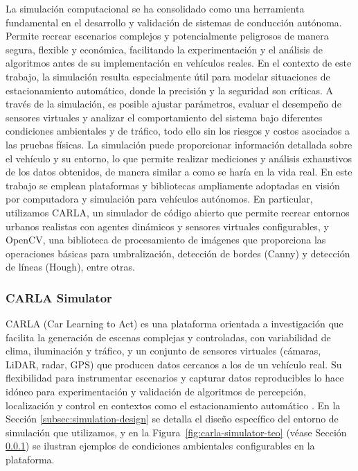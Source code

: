 \noindent
La simulación computacional se ha consolidado como una herramienta fundamental
en el desarrollo y validación de sistemas de conducción autónoma.
Permite recrear escenarios complejos y potencialmente peligrosos de manera segura,
flexible y económica, facilitando la experimentación y el análisis de algoritmos
antes de su implementación en vehículos reales. En el contexto de este trabajo,
la simulación resulta especialmente útil para modelar situaciones de estacionamiento
automático, donde la precisión y la seguridad son críticas. A través de la simulación,
es posible ajustar parámetros, evaluar el desempeño de sensores virtuales y analizar el
comportamiento del sistema bajo diferentes condiciones ambientales y de tráfico,
todo ello sin los riesgos y costos asociados a las pruebas físicas.
La simulación puede proporcionar información detallada sobre el vehículo y
su entorno, lo que permite realizar mediciones y análisis exhaustivos de los
datos obtenidos, de manera similar a como se haría en la vida real.
\noindent
En este trabajo se emplean plataformas y bibliotecas ampliamente adoptadas en visión
por computadora y simulación para vehículos autónomos.
En particular, utilizamos CARLA, un simulador de código abierto que permite recrear entornos urbanos realistas
con agentes dinámicos y sensores virtuales configurables, y OpenCV, una biblioteca de procesamiento
de imágenes que proporciona las operaciones básicas para umbralización, detección de bordes (Canny)
y detección de líneas (Hough), entre otras.

\subsubsection{CARLA Simulator}\label{sec:carla-teorico}
\noindent
CARLA (Car Learning to Act) es una plataforma orientada a investigación que facilita la generación de escenas
complejas y controladas, con variabilidad de clima, iluminación y tráfico, y un conjunto de sensores virtuales
(cámaras, LiDAR, radar, GPS) que producen datos cercanos a los de un vehículo real.
Su flexibilidad para instrumentar escenarios y capturar datos reproducibles lo hace idóneo para
experimentación y validación de algoritmos de percepción, localización y control en contextos como el
estacionamiento automático \cite{dosovitskiy2017carla}.
En la Sección \ref{subsec:simulation-design} se detalla el diseño específico del entorno de simulación que
utilizamos, y en la Figura~\ref{fig:carla-simulator-teo} (véase Sección \ref{sec:carla-teorico}) se ilustran ejemplos
de condiciones ambientales configurables en la plataforma.

